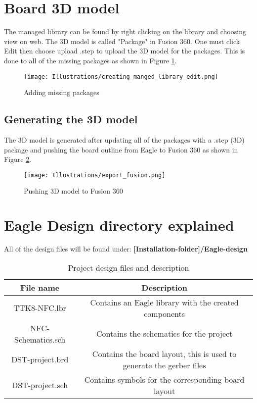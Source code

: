 \section{Board 3D model}
The managed library can be found by right clicking on the library and choosing view on web. The 3D model is called "Package" in Fusion 360. One must click Edit then choose upload .step to upload the 3D model for the packages. This is done to all of the missing packages as shown in Figure \ref{missing_package}.
\begin{figure}[h]
\begin{center}
\center
\texttt{[image: Illustrations/creating\_manged\_library\_edit.png]}  
\caption{Adding missing packages}
\label{missing_package}
\end{center}
\end{figure}

\subsection{Generating the 3D model}
The 3D model is generated after updating all of the packages with a .step (3D) package and pushing the board outline from Eagle to Fusion 360 as shown in Figure \ref{pushing_3D}.


\begin{figure}[h]
\begin{center}
\center
\texttt{[image: Illustrations/export\_fusion.png]}   
\caption{Pushing 3D model to Fusion 360}
\label{pushing_3D}
\end{center}
\end{figure}


\section{Eagle Design directory explained}
All of the design files will be found under: \textbf{[Installation-folder]/Eagle-design}
\begin{table}
\centering
\begin{tabular}{|c|c|}
\hline 
\rowcolor{Gray}
File name  & Description  \\ 
\hline 
TTK8-NFC.lbr & Contains an Eagle library with the created components \\ 
\hline 
NFC-Schematics.sch & Contains the schematics for the project \\ 
\hline 
DST-project.brd & Contains the board layout, this is used to generate the gerber files \\ 
\hline 
DST-project.sch & Contains symbols for the corresponding board layout \\ 
\hline 
\end{tabular} 
\caption{Project design files and description} \label{tb:design}
\end{table}
